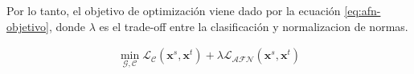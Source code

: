Por lo tanto, el objetivo de optimización viene dado por la ecuaci\'on \ref{eq:afn-objetivo}, donde $\lambda$ es el
trade-off entre la clasificaci\'on y normalizacion de normas.

\begin{align}
    \min_{\mathcal{G}, \mathcal{C}} \mathcal{L}_{\mathcal{C}}(\mathbf{x}^s, \mathbf{x}^t) + \lambda \mathcal{L}_{\mathcal{AFN}}(\mathbf{x}^s, \mathbf{x}^t)
    \label{eq:afn-objetivo}
\end{align}